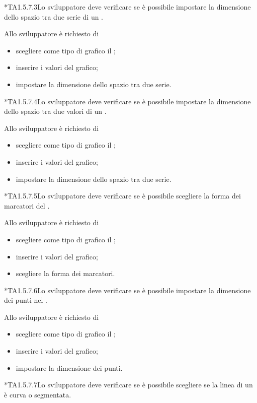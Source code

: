 	*{TA1.5.7.3}Lo sviluppatore deve verificare se è possibile impostare la dimensione dello spazio tra due serie di un .

		Allo sviluppatore è richiesto di
		\begin{itemize}
			\item scegliere come tipo di grafico il ;
			\item inserire i valori del grafico;
			\item impostare la dimensione dello spazio tra due serie.
		\end{itemize}

	*{TA1.5.7.4}Lo sviluppatore deve verificare se è possibile impostare la dimensione dello spazio tra due valori di un .

		Allo sviluppatore è richiesto di
		\begin{itemize}
			\item scegliere come tipo di grafico il ;
			\item inserire i valori del grafico;
			\item impostare la dimensione dello spazio tra due serie.
		\end{itemize}

	*{TA1.5.7.5}Lo sviluppatore deve verificare se è possibile scegliere la forma dei marcatori del .

		Allo sviluppatore è richiesto di
		\begin{itemize}
			\item scegliere come tipo di grafico il ;
			\item inserire i valori del grafico;
			\item scegliere la forma dei marcatori.
		\end{itemize}

	*{TA1.5.7.6}Lo sviluppatore deve verificare se è possibile impostare la dimensione dei punti nel .

		Allo sviluppatore è richiesto di
		\begin{itemize}
			\item scegliere come tipo di grafico il ;
			\item inserire i valori del grafico;
			\item impostare la dimensione dei punti.
		\end{itemize}

	*{TA1.5.7.7}Lo sviluppatore deve verificare se è possibile scegliere se la linea di un  è curva o segmentata.

